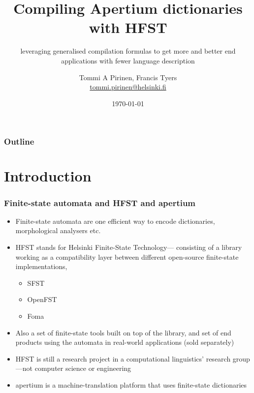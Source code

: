 \documentclass{beamer}
\title[Compiling apertium monodix with HFST]{Compiling Apertium dictionaries with HFST}
\subtitle{leveraging generalised compilation formulas to get more and better
end applications with fewer language description}
\author[Tommi A Pirinen]{Tommi A Pirinen, Francis Tyers\\
\url{tommi.pirinen@helsinki.fi}}
\institute[Helsinki]{University of Helsinki, Universitat d'Alacant}
\date{\today}
\begin{document}
\maketitle

\begin{frame}
    \frametitle{Outline}
    \tableofcontents
\end{frame}

\section{Introduction}

\begin{frame}
    \frametitle{Finite-state automata and HFST and apertium}
    \begin{itemize}
        \item Finite-state automata are one efficient way to encode 
            dictionaries, morphological analysers etc.
        \item HFST stands for Helsinki Finite-State \alert{Technology}---
            consisting of a library working as a compatibility layer between
            different open-source finite-state implementations, 
				\begin{itemize}
					\item SFST
					\item OpenFST
					\item Foma
				\end{itemize}
			\item	Also a set of finite-state tools built on top of the library, and set of end
            products using the automata in real-world applications (sold
            separately)
        \item HFST is still a research project in a computational linguistics'
            research group---not computer science or engineering
        \item apertium is a machine-translation platform that uses finite-state
            dictionaries
    \end{itemize}
\end{frame}
\end{document}
